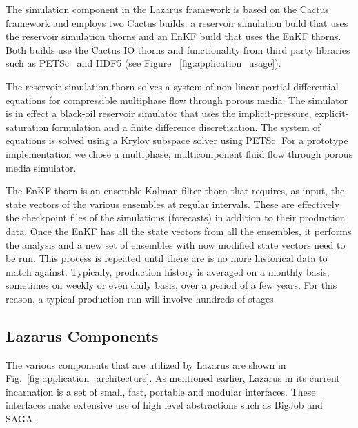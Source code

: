 \documentclass{sig-alternate}
\begin{document}
The simulation component in the Lazarus framework is based on the Cactus framework and employs two Cactus builds: a reservoir simulation build that uses the reservoir simulation thorns and an EnKF build that uses the EnKF thorns. Both builds use the Cactus IO thorns and functionality from third party libraries such as PETSc~\cite{PETSc} and HDF5 (see Figure ~\ref{fig:application_usage}).


The reservoir simulation thorn solves a system of non-linear partial
differential equations for compressible multiphase flow through porous
media. The simulator is in effect a black-oil reservoir simulator that
uses the implicit-pressure, explicit-saturation formulation and a
finite difference discretization. The system of equations is solved
using a Krylov subspace solver using PETSc. For a prototype
implementation we chose a multiphase, multicomponent fluid flow
through porous media simulator.

The EnKF thorn is an ensemble Kalman filter thorn that requires, as input, the state vectors of the various ensembles at regular intervals. These are effectively the checkpoint files of the simulations (forecasts) in addition to their production data. Once the EnKF has all the state vectors from all the ensembles, it performs the analysis and a new set of ensembles with now modified state vectors need to be run. This process is repeated until there are is no more historical data to match against. Typically, production history is averaged on a monthly basis, sometimes on weekly or even daily basis, over a period of a few years. For this reason, a typical production run will involve hundreds of stages.

\subsection{Lazarus Components}

The various components that are utilized by Lazarus are shown in Fig.~\ref{fig:application_architecture}.  As mentioned earlier, Lazarus in its current incarnation is a set of small, fast, portable and modular interfaces. These interfaces make extensive use of high level abstractions such as BigJob and SAGA.
\end{document}
